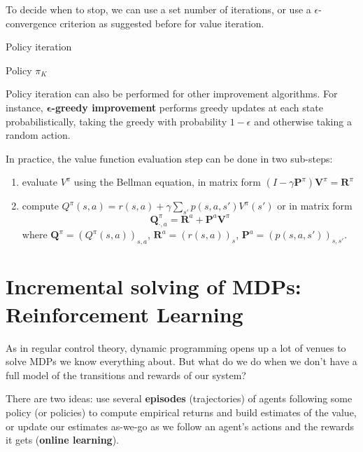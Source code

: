 \documentclass[../course-notes.tex]{subfiles}
\begin{document}
To decide when to stop, we can use a set number of iterations, or use a $\epsilon$-convergence criterion as suggested before for value iteration.

\begin{algorithm}\label{algo:PolicyIteration}
	\caption{Policy iteration}
	\Return Policy $\pi_K$\;
\end{algorithm}


Policy iteration can also be performed for other improvement algorithms. For instance, \textbf{$\boldsymbol\epsilon$-greedy improvement} performs greedy updates at each state probabilistically, taking the greedy with probability $1-\epsilon$ and otherwise taking a random action.

In practice, the value function evaluation step can be done in two sub-steps:
\begin{enumerate}
	\item evaluate $V^\pi$ using the Bellman equation, in matrix form $(I-\gamma\mathbf{P}^\pi)\mathbf{V}^\pi = \mathbf{R}^\pi$
	\item compute $Q^\pi(s,a) = r(s,a) + \gamma \sum_{s'} p(s,a,s')V^\pi(s')$ or in matrix form
	\[
		\mathbf{Q}^\pi_{\cdot, a} = \mathbf{R}^a + \mathbf{P}^a \mathbf{V}^\pi
	\]
	where $\mathbf{Q}^\pi = (Q^\pi(s,a))_{s,a}$, $\mathbf{R}^a = (r(s,a))_s$, $\mathbf{P}^a = (p(s,a,s'))_{s,s'}$.
\end{enumerate}




\chapter{Incremental solving of MDPs: Reinforcement Learning}\label{chap:incrRL}

As in regular control theory, dynamic programming opens up a lot of venues to solve MDPs we know everything about. But what do we do when we don't have a full model of the transitions and rewards of our system?

There are two ideas: use several \textbf{\bluefont episodes} (trajectories) of agents following some policy (or policies) to compute empirical returns and build estimates of the value, or update our estimates as-we-go as we follow an agent's actions and the rewards it gets (\textbf{\bluefont online learning}).
\end{document}
